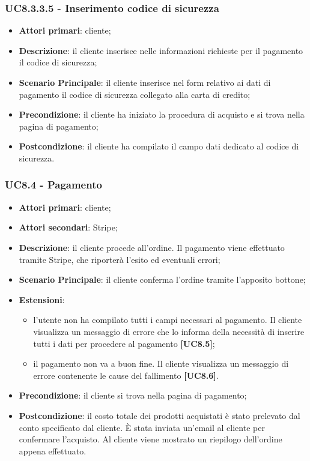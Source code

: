 \subsubsection{UC8.3.3.5 - Inserimento codice di sicurezza}
\begin{itemize}
\item \textbf{Attori primari}: cliente;
\item \textbf{Descrizione}: il cliente inserisce nelle informazioni richieste per il pagamento il codice di sicurezza;
\item \textbf{Scenario Principale}: il cliente inserisce nel form relativo ai dati di pagamento il codice di sicurezza collegato alla carta di credito;
\item \textbf{Precondizione}: il cliente ha iniziato la procedura di acquisto e si trova nella pagina di pagamento;
\item \textbf{Postcondizione}: il cliente ha compilato il campo dati dedicato al codice di sicurezza.
\end{itemize}

\subsubsection{UC8.4 - Pagamento}
\begin{itemize}
\item \textbf{Attori primari}: cliente;
\item \textbf{Attori secondari}: Stripe;
\item \textbf{Descrizione}: il cliente procede all'ordine. Il pagamento viene effettuato tramite Stripe, che riporterà l'esito ed eventuali errori;
\item \textbf{Scenario Principale}: il cliente conferma l'ordine tramite l'apposito bottone;
\item \textbf{Estensioni}:
\begin{itemize}
	\item l'utente non ha compilato tutti i campi necessari al pagamento. Il cliente visualizza un messaggio di errore che lo informa della necessità di inserire tutti i dati per procedere al pagamento \textbf{[UC8.5]};
	\item il pagamento non va a buon fine. Il cliente visualizza un messaggio di errore contenente le cause del fallimento \textbf{[UC8.6]}.
\end{itemize}
\item \textbf{Precondizione}: il cliente si trova nella pagina di pagamento;
\item \textbf{Postcondizione}: il costo totale dei prodotti acquistati è stato prelevato dal conto specificato dal cliente. È stata inviata un'email al cliente per confermare l'acquisto. Al cliente viene mostrato un riepilogo dell'ordine appena effettuato.
\end{itemize}

